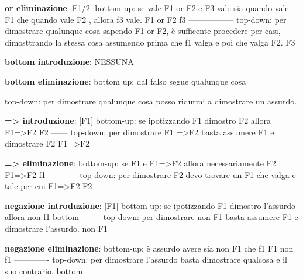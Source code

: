 \documentclass[12pt]{article}
\begin{document}
\textbf{or eliminazione}                                                                                                                                                                     [F1/2]
bottom-up: se vale F1 or F2 e F3 vale sia quando vale F1 che quando vale F2 , allora f3 vale.                                                                                    F1 or F2    f3   
                                                                                                                                                                                -----------------
top-down: per dimostrare qualunque cosa sapendo F1 or F2, è sufficente procedere per casi, dimosttrando la stessa cosa assumendo prima che f1 valga e poi che valga F2.           F3

\textbf{bottom introduzione}: NESSUNA

\textbf{bottom eliminazione}: 
bottom up: dal falso segue qualunque cosa

top-down: per dimostrare qualunque cosa posso ridurmi a dimostrare un assurdo.

\textbf{=> introduzione}:                                                 [F1]
bottom-up: se ipotizzando F1 dimostro F2 allora F1=>F2                   F2
                                                                        ------
top-down:  per dimostrare F1 =>F2 basta assumere F1 e dimostrare F2      F1=>F2

\textbf{=> eliminazione}:
bottom-up: se F1 e F1=>F2 allora necessariamente F2                                   F1=>F2   f1
                                                                                      -----------         
top-down: per dimostrare F2 devo trovare un F1 che valga e tale per cui F1=>F2         F2

\textbf{negazione introduzione}:                                                   [F1]
bottom-up: se ipotizzando F1 dimostro l'assurdo allora non f1                   bottom
                                                                                 -------
top-down: per dimostrare non F1 basta assumere F1 e dimostrare l'assurdo.         non F1

\textbf{negazione eliminazione}: 
bottom-up: è assurdo avere sia non F1 che f1                                           F1   non f1                      
                                                                                     -------------
top-down: per dimostrare l'assurdo basta dimostrare qualcosa e il suo contrario.           bottom
\end{document}
